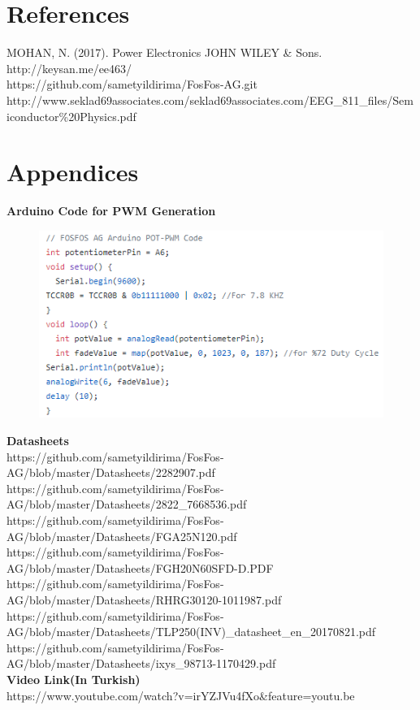 \documentclass{article}
\begin{document}
\section{References}
MOHAN, N. (2017). Power Electronics JOHN WILEY \& Sons.\\
http://keysan.me/ee463/  \\
https://github.com/sametyildirima/FosFos-AG.git\\
http://www.seklad69associates.com/seklad69associates.com/EEG\_811\_files/Semiconductor\%20Physics.pdf



\section*{Appendices}
\textbf{Arduino Code for PWM Generation} 
\begin{figure}[H]
\includegraphics[scale=0.8]{pwmcode}
\label{fig:members}
\end{figure} 
\noindent \textbf{Datasheets} \\
https://github.com/sametyildirima/FosFos-AG/blob/master/Datasheets/2282907.pdf\\
https://github.com/sametyildirima/FosFos-AG/blob/master/Datasheets/2822\_7668536.pdf\\
https://github.com/sametyildirima/FosFos-AG/blob/master/Datasheets/FGA25N120.pdf\\
https://github.com/sametyildirima/FosFos-AG/blob/master/Datasheets/FGH20N60SFD-D.PDF\\
https://github.com/sametyildirima/FosFos-AG/blob/master/Datasheets/RHRG30120-1011987.pdf\\
https://github.com/sametyildirima/FosFos-AG/blob/master/Datasheets/TLP250(INV)\_datasheet\_en\_20170821.pdf\\
https://github.com/sametyildirima/FosFos-AG/blob/master/Datasheets/ixys\_98713-1170429.pdf\\
\noindent \textbf{Video Link(In Turkish)} \\%
https://www.youtube.com/watch?v=irYZJVu4fXo&feature=youtu.be
\end{document}
